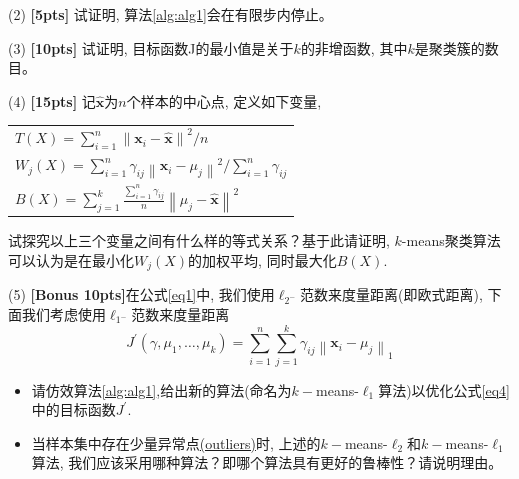 \documentclass[a4paper,UTF8]{article}
\theoremstyle{definition}
\begin{document}
(2) \textbf{[5pts]} 试证明, 算法\ref{alg:alg1}会在有限步内停止。


(3) \textbf{[10pts]} 试证明, 目标函数J的最小值是关于$k$的非增函数, 其中$k$是聚类簇的数目。

(4) \textbf{[15pts]} 记$\hat{\mathbf{x}}$为$n$个样本的中心点, 定义如下变量,

\begin{table}[h]
	\centering
	\begin{tabular}{l}
		$T(X)=\sum_{i=1}^{n}\left\|\mathbf{x}_{i}-\hat{\mathbf{x}}\right\|^{2} / n$  \\
		$W_{j}(X)=\sum_{i=1}^{n} \gamma_{i j}\left\|\mathbf{x}_{i}-\mu_{j}\right\|^{2} / \sum_{i=1}^{n} \gamma_{i j}$  \\
		$B(X)=\sum_{j=1}^{k} \frac{\sum_{i=1}^{n} \gamma_{i j}}{n}\left\|\mu_{j}-\hat{\mathbf{x}}\right\|^{2}$  \\
	\end{tabular}
\end{table}

试探究以上三个变量之间有什么样的等式关系？基于此请证明, $k$-means聚类算法可以认为是在最小化$W_j(X)$的加权平均, 同时最大化$B(X)$.


(5) \textbf{[Bonus 10pts]}在公式\ref{eq1}中, 我们使用$\ell_{2^{-}}$范数来度量距离(即欧式距离), 下面我们考虑使用$\ell_{1^{-}}$范数来度量距离
\begin{equation}
\label{eq4}
J^{\prime}\left(\gamma, \mu_{1}, \ldots, \mu_{k}\right)=\sum_{i=1}^{n} \sum_{j=1}^{k} \gamma_{i j}\left\|\mathbf{x}_{i}-\mu_{j}\right\|_{1}
\end{equation}
\begin{itemize}
	\item 请仿效算法\ref{alg:alg1},给出新的算法(命名为$k-$means-$\ell_{1}$算法)以优化公式\ref{eq4}中的目标函数$J^{\prime}$. 
	\item 当样本集中存在少量异常点\href{https://en.wikipedia.org/wiki/Outlier}{(outliers)}时, 上述的$k-$means-$\ell_{2}$和$k-$means-$\ell_{1}$算法,	我们应该采用哪种算法？即哪个算法具有更好的鲁棒性？请说明理由。
\end{itemize}
\end{document}
